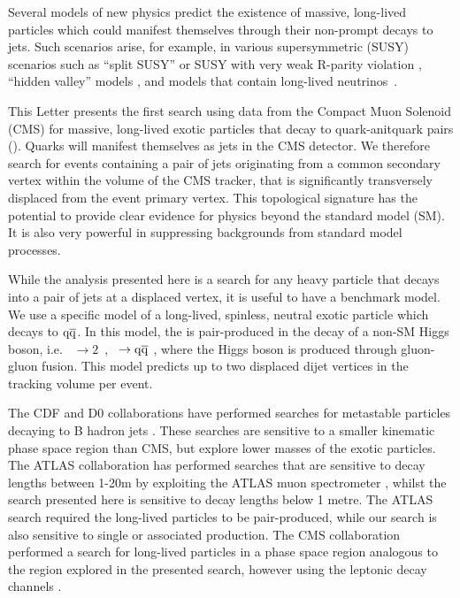 \label{chap:Introduction}

Several models of new physics predict the existence of massive, long-lived particles which could
manifest themselves through their non-prompt decays to jets. Such scenarios arise, for example,
in various supersymmetric (SUSY) scenarios such as ``split SUSY''
\cite{Hewett:2004nw} or SUSY with very weak R-parity violation \cite{Barbier:2004ez}, ``hidden valley'' models \cite{Han:2007ae}, and \Zprime models
that contain long-lived neutrinos~\cite{Basso:2008iv}.

This Letter presents the first search using data from the Compact Muon
Solenoid (CMS) for massive, long-lived exotic particles \X that decay 
to quark-anitquark pairs (\qq). Quarks will manifest themselves as jets in the CMS detector. 
We therefore search for events
containing a pair of jets originating from a common secondary
vertex within the volume of the CMS tracker,
that is significantly transversely displaced from the event primary vertex.
This topological signature has the potential to provide clear evidence for
physics beyond the standard model (SM). It is also very powerful in suppressing backgrounds from 
standard model processes.

While the analysis presented here is a search for any heavy particle that decays into a pair of jets
 at a displaced vertex, it is useful to have a benchmark model.
We use a specific model of a long-lived, spinless, neutral
exotic particle \X which decays to $\mathrm{q}\overline{\mathrm{q}}$. In this 
model, the \X is pair-produced in the decay of a non-SM Higgs boson, i.e.  \Higgs~$\rightarrow
2$\X~, \X~$\rightarrow\mathrm{q}\overline{\mathrm{q}}$ \cite{Strassler:2006ri}, where the Higgs boson is produced through gluon-gluon
fusion. This model predicts up to two displaced
dijet vertices in the tracking volume per event. 

The CDF and D0 collaborations have performed searches for metastable particles decaying to B hadron 
jets \cite{Aaltonen:2011rja, Abazov:2009ik}.
These searches are sensitive to a smaller kinematic phase space region than CMS, but explore
lower masses of the exotic particles. The ATLAS collaboration
has performed searches that are sensitive to decay lengths between 1-20\unit{m} by exploiting the ATLAS muon
 spectrometer \cite{ATLAS:2012av}, whilst the search presented here is sensitive to decay lengths below 1 metre.
 The ATLAS search required the long-lived particles to be pair-produced,
while our search  
is also sensitive to single or associated production. The CMS collaboration performed
a search for long-lived particles in a phase space region analogous to the region explored in the presented search,
 however using the leptonic decay channels \cite{Chatrchyan:2012jna}.
  


